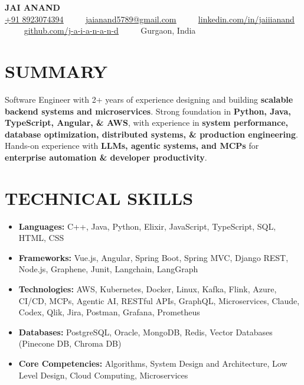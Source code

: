 \documentclass[letterpaper,10pt]{article}
\renewcommand{\normalsize}{%
  \fontsize{10.1}{12.25}\selectfont
}
\begin{document}
\begin{center}
    {\Huge \textbf{JAI ANAND}} \\ \vspace{4pt}
    \small
    \href{tel:+918923074394}{\underline{+91 8923074394}} ~~\textbullet~~ 
    \href{mailto:jaianand5789@gmail.com}{\underline{jaianand5789@gmail.com}} ~~\textbullet~~ 
    \href{https://linkedin.com/in/jaiiianand/}{\underline{linkedin.com/in/jaiiianand}} ~~\textbullet~~ 
    \href{https://github.com/j-a-i-a-n-a-n-d}{\underline{github.com/j-a-i-a-n-a-n-d}} ~~\textbullet~~
    Gurgaon, India
\end{center}

\section{SUMMARY}
Software Engineer with 2+ years of experience designing and building \textbf{scalable backend systems and microservices}. Strong foundation in \textbf{Python, Java, TypeScript, Angular, \& AWS}, with experience in \textbf{system performance, database optimization, distributed systems, \& production engineering}. Hands-on experience with \textbf{LLMs, agentic systems, and MCPs} for \textbf{enterprise automation \& developer productivity}.

\section{TECHNICAL SKILLS}
  \begin{itemize}[leftmargin=0.0in, label={}, itemsep=1pt, parsep=0pt, topsep=0pt]
    \item \normalsize{
     \textbf{\normalsize Languages:}{ C++, Java, Python, Elixir, JavaScript, TypeScript, SQL, HTML, CSS}
    }
    \item \normalsize{
     \textbf{\normalsize Frameworks:}{ Vue.js, Angular, Spring Boot, Spring MVC, Django REST, Node.js, Graphene, Junit, Langchain, LangGraph}
    }
    \item \normalsize{
     \textbf{\normalsize Technologies:}{ AWS, Kubernetes, Docker, Linux, Kafka, Flink, Azure, CI/CD, MCPs, Agentic AI, RESTful APIs, GraphQL, Microservices, Claude, Codex, Qlik, Jira, Postman, Grafana, Prometheus}
    }
    \item \normalsize{
     \textbf{\normalsize Databases:}{ PostgreSQL, Oracle, MongoDB, Redis, Vector Databases (Pinecone DB, Chroma DB)}
    }    
    \item \normalsize{
     \textbf{\normalsize Core Competencies:}{ Algorithms, System Design and Architecture, Low Level Design, Cloud Computing, Microservices }
    }
  \end{itemize}
\end{document}
